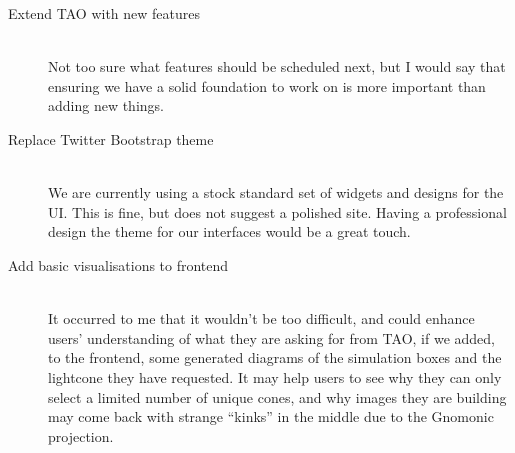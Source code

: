 \documentclass[12pt]{scrartcl}
\begin{document}
\begin{description}
  \item[Extend TAO with new features] \hfill \\
    Not too sure what features should be scheduled next, but I would
    say that ensuring we have a solid foundation to work on is more
    important than adding new things.
  \item[Replace Twitter Bootstrap theme] \hfill \\
    We are currently using a stock standard set of widgets and designs
    for the UI. This is fine, but does not suggest a polished
    site. Having a professional design the theme for our interfaces
    would be a great touch.
  \item[Add basic visualisations to frontend] \hfill \\
    It occurred to me that it wouldn't be too difficult, and could
    enhance users' understanding of what they are asking for from TAO,
    if we added, to the frontend, some generated diagrams of the
    simulation boxes and the lightcone they have requested. It may
    help users to see why they can only select a limited number of
    unique cones, and why images they are building may come back with
    strange ``kinks'' in the middle due to the Gnomonic projection.
\end{description}
\end{document}
